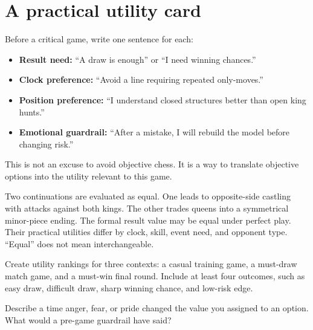 \section{A practical utility card}
Before a critical game, write one sentence for each:

\begin{itemize}[leftmargin=1.4em]
\item \textbf{Result need:} ``A draw is enough'' or ``I need winning chances.''
\item \textbf{Clock preference:} ``Avoid a line requiring repeated only-moves.''
\item \textbf{Position preference:} ``I understand closed structures better than open king hunts.''
\item \textbf{Emotional guardrail:} ``After a mistake, I will rebuild the model before changing risk.''
\end{itemize}

This is not an excuse to avoid objective chess. It is a way to translate objective options into the utility relevant to this game.

\begin{workedbox}[title={Worked example: equal is not identical}]
Two continuations are evaluated as equal. One leads to opposite-side castling with attacks against both kings. The other trades queens into a symmetrical minor-piece ending. The formal result value may be equal under perfect play. Their practical utilities differ by clock, skill, event need, and opponent type. ``Equal'' does not mean interchangeable.
\end{workedbox}

\begin{exercise}
Create utility rankings for three contexts: a casual training game, a must-draw match game, and a must-win final round. Include at least four outcomes, such as easy draw, difficult draw, sharp winning chance, and low-risk edge.
\end{exercise}

\begin{exercise}
Describe a time anger, fear, or pride changed the value you assigned to an option. What would a pre-game guardrail have said?
\end{exercise}


